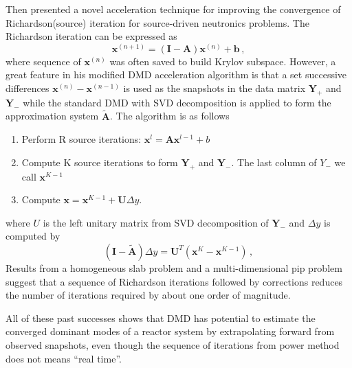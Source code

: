 Then \citet{mcclarren_acceleration_2018} presented a novel acceleration technique for improving the convergence of Richardson(source) iteration for source-driven neutronics problems.
The Richardson iteration can be expressed as 
\begin{equation}
 \mathbf{x}^{(n+1)} = (\mathbf{I}-\mathbf{A})\mathbf{x}^{(n)} + \mathbf{b} \, ,
 \label{eq:richardson}
\end{equation}
where sequence of $\mathbf{x}^{(n)}$ was often saved to build Krylov subspace. 
However, a great feature in his modified DMD acceleration algorithm is that a set successive differences $\mathbf{x}^{(n)}-\mathbf{x}^{(n-1)}$ is used as the snapshots in the data matrix $\mathbf{Y}_+$ and $\mathbf{Y}_-$ while the standard DMD with SVD decomposition is applied to form the approximation system $\mathbf{\tilde{A}}$.
The algorithm is as follows
\begin{enumerate}
 \item Perform R source iterations: $\mathbf{x}^{l} = \mathbf{A} \mathbf{x}^{l-1} +b$
 \item Compute K source iterations to form $\mathbf{Y}_+$ and $\mathbf{Y}_-$. The last column of $Y_-$ we call $\mathbf{x}^{K-1}$ 
 \item Compute $\mathbf{x} = \mathbf{x}^{K-1} + \mathbf{U} \Delta y$.
\end{enumerate} 
where $U$ is the left unitary matrix from SVD decomposition of $\mathbf{Y}_-$ and $\Delta y$ is computed by 
\begin{equation}
 (\mathbf{I} - \mathbf{\tilde{A}}) \Delta y = \mathbf{U}^T(\mathbf{x}^{K} - \mathbf{x}^{K-1})\, ,
 \label{eq:McClarren}
\end{equation}
Results from a homogeneous slab problem and a multi-dimensional pip problem suggest that a sequence of Richardson iterations followed by corrections reduces the number of iterations required by about one order of magnitude.

All of these past successes shows that DMD has potential to estimate the converged dominant modes of a reactor system by extrapolating forward from observed snapshots, even though the sequence of iterations from power method does not means ``real time''.
